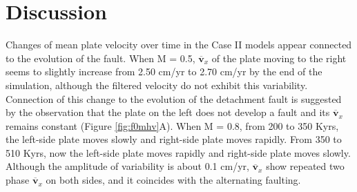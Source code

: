 \documentclass[letterpaper,12pt,notitle]{memphisthesis}                     %
\begin{document}
\chapter{Discussion}


%

Changes of mean plate velocity over time in the Case II models appear connected to the evolution of the fault.
When M = 0.5, $\overline{\boldsymbol{v}}_{x}$ of the plate moving to the right seems to slightly increase from 2.50 cm/yr to 2.70 cm/yr by the end of the simulation, although the filtered velocity do not exhibit this variability. Connection of this change to the evolution of the detachment fault is suggested by the observation that the plate on the left does not develop a fault and its $\overline{\boldsymbol{v}}_{x}$ remains constant (Figure \ref{fig:f0mhv}A). When M = 0.8, from 200 to 350 Kyrs, the left-side plate moves slowly and right-side plate moves rapidly. From 350 to 510 Kyrs, now the left-side plate moves rapidly and right-side plate moves slowly. Although the amplitude of variability is about 0.1 cm/yr, $\overline{\boldsymbol{v}}_{x}$ show repeated two phase $\overline{\boldsymbol{v}}_{x}$ on both sides, and it coincides with the alternating faulting. 
\end{document}
